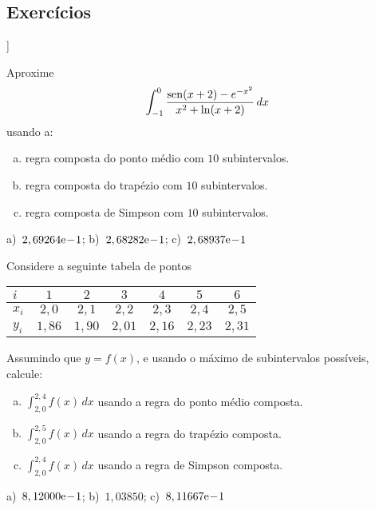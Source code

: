 \subsection*{Exercícios}

\begin{flushleft}
  [[tag:revisar]]
\end{flushleft}

\begin{exer}\label{exer:int_comp_fun}
  Aproxime
  \begin{equation}
    \int_{-1}^0 \frac{\operatorname{sen}(x+2)-e^{-x^2}}{x^2+\ln(x+2)}\,dx
  \end{equation}
usando a:
\begin{enumerate}[a)]
\item regra composta do ponto médio com $10$ subintervalos.
\item regra composta do trapézio com $10$ subintervalos.
\item regra composta de Simpson com $10$ subintervalos.
\end{enumerate}
\end{exer}
\begin{resp}
  a)~$2,69264\mathrm{e}\!-\!1$; b)~$2,68282\mathrm{e}\!-\!1$; c)~$2,68937\mathrm{e}\!-\!1$
\end{resp}

\begin{exer}\label{exer:int_comp_tab}
  Considere a seguinte tabela de pontos
  \begin{center}
    \begin{tabular}{l|cccccc}
      $i$ & $1$ & $2$ & $3$ & $4$ & $5$ & $6$ \\\hline
      $x_i$ & $2,0$ & $2,1$ & $2,2$ & $2,3$ & $2,4$ & $2,5$ \\
      $y_i$ & $1,86$ & $1,90$ & $2,01$ & $2,16$ & $2,23$ & $2,31$ \\\hline
    \end{tabular}
  \end{center}
Assumindo que $y = f(x)$, e usando o máximo de subintervalos possíveis, calcule:
\begin{enumerate}[a)]
\item $\displaystyle \int_{2,0}^{2,4} f(x)\,dx$ usando a regra do ponto médio composta.
\item $\displaystyle \int_{2,0}^{2,5} f(x)\,dx$ usando a regra do trapézio composta.
\item $\displaystyle \int_{2,0}^{2,4} f(x)\,dx$ usando a regra de Simpson composta.
\end{enumerate}
\end{exer}
\begin{resp}
  a)~$8,12000\mathrm{e}\!-\!1$; b)~$1,03850$; c)~$8,11667\mathrm{e}\!-\!1$
\end{resp}

